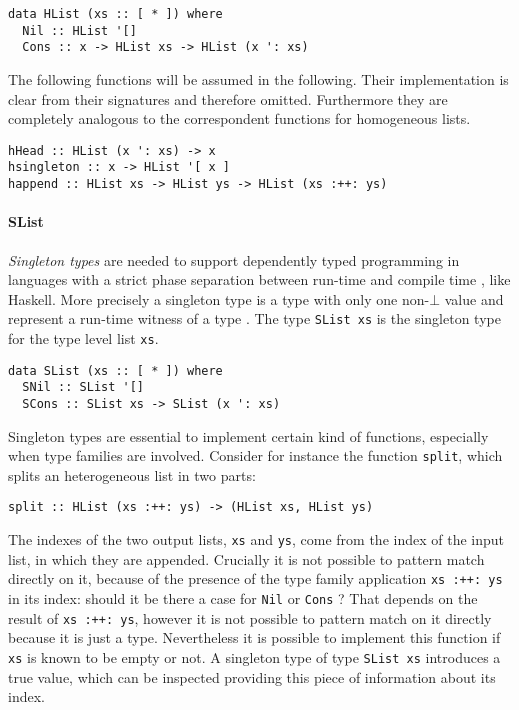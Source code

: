 \documentclass[../Thesis.tex]{subfiles}
\begin{document}
\begin{verbatim}
data HList (xs :: [ * ]) where
  Nil :: HList '[] 
  Cons :: x -> HList xs -> HList (x ': xs) 
\end{verbatim}

	The following functions will be assumed in the following.
	Their implementation is clear from their
	signatures and therefore omitted. 
	Furthermore they are completely analogous to 
	the correspondent functions for homogeneous lists.
	
\begin{verbatim}
hHead :: HList (x ': xs) -> x
hsingleton :: x -> HList '[ x ]
happend :: HList xs -> HList ys -> HList (xs :++: ys)
\end{verbatim}

	\paragraph{SList}
	\label{par:SList}
	\emph{Singleton types} are needed to support dependently 
	typed programming in languages with a strict phase separation
	between run-time and compile time \cite{Eisenberg12DTPS}, like Haskell.
	More precisely a singleton type is a type with only one non-$\bot$ value 
	and represent a run-time witness of a type \cite{Eisenberg12DTPS}.
	The type \texttt{SList xs} is the singleton type for the type level list 
	\texttt{xs}.
	
\begin{verbatim}
data SList (xs :: [ * ]) where
  SNil :: SList '[]
  SCons :: SList xs -> SList (x ': xs)
\end{verbatim}

	Singleton types are essential to implement certain kind of functions,
	especially when type families are involved.
	Consider for instance the function \texttt{split}, which
	splits an heterogeneous list in two parts:
\begin{verbatim}
split :: HList (xs :++: ys) -> (HList xs, HList ys)
\end{verbatim}

	The indexes of the two output lists, \texttt{xs} and \texttt{ys},
	come from the index of the input list, in which they are appended.
	Crucially it is not possible to pattern match directly on it, because
	of the presence of the type family application \texttt{xs :++: ys} in
	its index:
	should it be 	there a case for \texttt{Nil} or \texttt{Cons} ?
	That depends on the result of \texttt{xs :++: ys}, 
	however it is not possible to pattern match on it 
	directly because it is just a type.
	Nevertheless it is possible to implement this function if \texttt{xs}
	is known to be empty or not.
	A singleton type of type \texttt{SList xs}
	introduces a true value, which can be inspected 
	providing this piece of information about its index.
	
\end{document}
